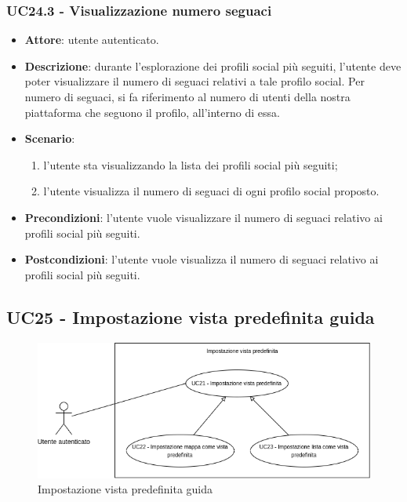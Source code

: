 \subsubsection{UC24.3 - Visualizzazione numero seguaci}
\begin{itemize}
    \item \textbf{Attore}: utente autenticato.
    \item \textbf{Descrizione}: durante l'esplorazione dei profili social più seguiti,
    l'utente deve poter visualizzare il numero di seguaci relativi a tale profilo social.
    Per numero di seguaci, si fa riferimento al numero di utenti della nostra piattaforma
    che seguono il profilo, all'interno di essa.
    \item \textbf{Scenario}:
    \begin{enumerate}
        \item l'utente sta visualizzando la lista dei profili social più seguiti;
        \item l'utente visualizza il numero di seguaci di ogni profilo social proposto.
    \end{enumerate}
    \item \textbf{Precondizioni}: l'utente vuole visualizzare il numero di seguaci relativo ai  profili social più seguiti.
    \item \textbf{Postcondizioni}: l'utente vuole visualizza il numero di seguaci relativo ai  profili social più seguiti.
\end{itemize}

\subsection{UC25 - Impostazione vista predefinita guida}
\begin{figure}[!h]
    \includegraphics[width=15cm]{sezioni/Images/UC25_s.png}
    \centering
    \caption{Impostazione vista predefinita guida}
\end{figure}

